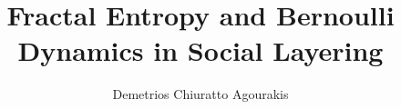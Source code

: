 \IfFileExists{rsproca.cls}{\documentclass{rsproca}}{\documentclass{article}}
\begin{document}
\title{Fractal Entropy and Bernoulli Dynamics in Social Layering}
\author{Demetrios Chiuratto Agourakis}








\end{document}
